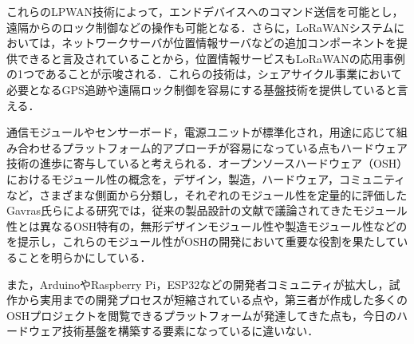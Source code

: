           \par これらのLPWAN技術によって，エンドデバイスへのコマンド送信を可能とし，遠隔からのロック制御などの操作も可能となる．さらに，LoRaWANシステムにおいては，ネットワークサーバが位置情報サーバなどの追加コンポーネントを提供できると言及されていることから，位置情報サービスもLoRaWANの応用事例の1つであることが示唆される．これらの技術は，シェアサイクル事業において必要となるGPS追跡や遠隔ロック制御を容易にする基盤技術を提供していると言える．
          \par 通信モジュールやセンサーボード，電源ユニットが標準化され，用途に応じて組み合わせるプラットフォーム的アプローチが容易になっている点もハードウェア技術の進歩に寄与していると考えられる．オープンソースハードウェア（OSH）におけるモジュール性の概念を，デザイン，製造，ハードウェア，コミュニティなど，さまざまな側面から分類し，それぞれのモジュール性を定量的に評価したGavras氏らによる研究では，従来の製品設計の文献で議論されてきたモジュール性とは異なるOSH特有の，無形デザインモジュール性や製造モジュール性などのを提示し，これらのモジュール性がOSHの開発において重要な役割を果たしていることを明らかにしている．
          \par また，ArduinoやRaspberry Pi，ESP32などの開発者コミュニティが拡大し，試作から実用までの開発プロセスが短縮されている点や，第三者が作成した多くのOSHプロジェクトを閲覧できるプラットフォームが発達してきた点も，今日のハードウェア技術基盤を構築する要素になっているに違いない．
      
